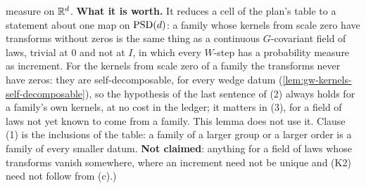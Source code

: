 \begin{lemma}
{measure on $\mathbb{R}^d$. \textbf{What it is worth.} It reduces a cell of the plan's table to a statement about
one map on $\mathrm{PSD}(d)$: a family whose kernels from scale zero have transforms without zeros is the same
thing as a continuous $G$-covariant field of laws, trivial at $0$ and not at $I$, in which every
$W$-step has a probability measure as increment. For the kernels from scale zero of a family the
transforms never have zeros: they are self-decomposable, for every wedge datum
(\ref{lem:gw-kernels-self-decomposable}), so the hypothesis of the last sentence of (2) always holds
for a family's own kernels, at no cost in the ledger; it matters in (3), for a field of laws not yet
known to come from a family. This lemma does not use it. Clause (1) is the inclusions of the table: a
family of a larger group or a larger order is a family of every smaller datum. \textbf{Not claimed}:
anything for a field of laws whose transforms vanish somewhere, where an increment need not be unique and
(K2) need not follow from (c).)}
\end{lemma}

